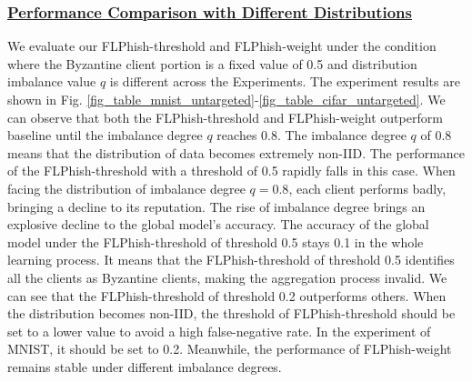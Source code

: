\documentclass[journal]{IEEEtran}
\begin{document}
    \subsubsection{\ul{Performance Comparison with Different Distributions}} We evaluate our FLPhish-threshold and FLPhish-weight under the condition where the Byzantine client portion is a fixed value of 0.5 and distribution imbalance value $q$ is different across the Experiments. The experiment results are shown in Fig. \ref{fig_table_mnist_untargeted}-\ref{fig_table_cifar_untargeted}. We can observe that both the FLPhish-threshold and FLPhish-weight outperform baseline until the imbalance degree $q$ reaches 0.8. The imbalance degree $q$ of 0.8 means that the distribution of data becomes extremely non-IID. The performance of the FLPhish-threshold with a threshold of 0.5 rapidly falls in this case. When facing the distribution of imbalance degree $q=0.8$, each client performs badly, bringing a decline to its reputation. The rise of imbalance degree brings an explosive decline to the global model's accuracy. The accuracy of the global model under the FLPhish-threshold of threshold 0.5 stays 0.1 in the whole learning process. It means that the FLPhish-threshold of threshold 0.5 identifies all the clients as Byzantine clients, making the aggregation process invalid. We can see that the FLPhish-threshold of threshold 0.2 outperforms others. When the distribution becomes non-IID, the threshold of FLPhish-threshold should be set to a lower value to avoid a high false-negative rate. In the experiment of MNIST, it should be set to 0.2. Meanwhile, the performance of FLPhish-weight remains stable under different imbalance degrees.
    
\end{document}
